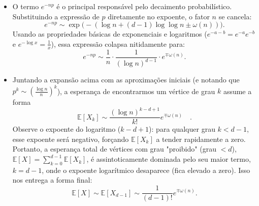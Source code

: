 \documentclass[11pt, a4paper]{article}
\begin{document}
\begin{enumerate}
\begin{itemize}
        \item O termo $e^{-np}$ é o principal responsável pelo decaimento probabilístico. Substituindo a expressão de $p$ diretamente no expoente, o fator $n$ se cancela:
        \[ e^{-np} \sim \exp\big(-(\log n + (d-1)\log\log n \pm \omega(n))\big). \]
        Usando as propriedades básicas de exponenciais e logaritmos ($e^{-a-b} = e^{-a}e^{-b}$ e $e^{-\log x} = \frac{1}{x}$), essa expressão colapsa nitidamente para:
        \[ e^{-np} \sim \frac{1}{n} \cdot \frac{1}{(\log n)^{d-1}} \cdot e^{\mp\omega(n)}. \]
        
        \item Juntando a expansão acima com as aproximações iniciais (e notando que $p^k \sim \left(\frac{\log n}{n}\right)^k$), a esperança de encontrarmos um vértice de grau $k$ assume a forma \[\mathbb{E}[X_k] \sim \frac{(\log n)^{k-d+1}}{k!}e^{\mp\omega(n)} \quad .\] Observe o expoente do logaritmo ($k-d+1$): para qualquer grau $k < d-1$, esse expoente será negativo, forçando $\mathbb{E}[X_k]$ a tender rapidamente a zero. Portanto, a esperança total de vértices com grau "proibido" (grau $< d$), $\mathbb{E}[X] = \sum_{k=0}^{d-1} \mathbb{E}[X_k]$, é assintoticamente dominada pelo seu maior termo, $k = d-1$, onde o expoente logarítmico desaparece (fica elevado a zero). Isso nos entrega a forma final:
        \[ \mathbb{E}[X] \sim \mathbb{E}[X_{d-1}] \sim \frac{1}{(d-1)!}e^{\mp\omega(n)}. \]
    \end{itemize}



\end{enumerate}
\end{document}
